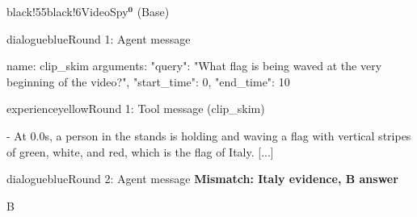 \begin{ExecutionBox}{black!55}{black!6}{VideoSpy$^{\mathbf{0}}$ (Base)}
\raggedright
\begin{MessageBox}{dialogueblue}{Round 1: Agent message}
\begin{Trajectory}
name: clip_skim  arguments: {"query": "What flag is being waved at the very beginning of the video?", "start_time": 0, "end_time": 10}
\end{Trajectory}
\end{MessageBox}
\begin{MessageBox}{experienceyellow}{Round 1: Tool message (clip\_skim)}
\begin{Trajectory}
[...] - At 0.0s, a person in the stands is holding and waving a flag with vertical stripes of green, white, and red, which is the flag of Italy. [...]
\end{Trajectory}
\end{MessageBox}
\begin{MessageBox}[agent message,frame hidden,borderline={1pt}{0pt}{changeaccent,dash pattern=on 3pt off 2pt},colbacktitle=red!4]{dialogueblue}{Round 2: Agent message}
\noindent\textcolor{changeaccent}{\textbf{Mismatch: Italy evidence, B answer}}\par
\begin{Trajectory}
B
\end{Trajectory}
\end{MessageBox}
\end{ExecutionBox}

